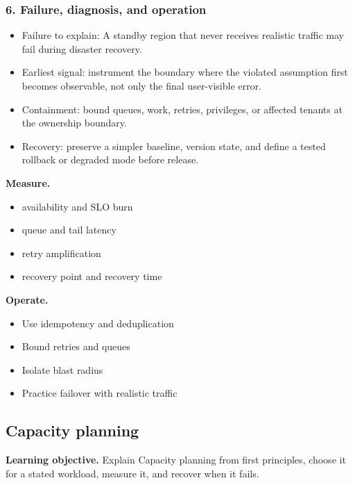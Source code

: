 \subsubsection*{6. Failure, diagnosis, and operation}
\begin{itemize}
\item Failure to explain: A standby region that never receives realistic traffic may fail during disaster recovery.
\item Earliest signal: instrument the boundary where the violated assumption first becomes observable, not only the final user-visible error.
\item Containment: bound queues, work, retries, privileges, or affected tenants at the ownership boundary.
\item Recovery: preserve a simpler baseline, version state, and define a tested rollback or degraded mode before release.
\end{itemize}
\textbf{Measure.}\begin{itemize}
\item availability and SLO burn
\item queue and tail latency
\item retry amplification
\item recovery point and recovery time
\end{itemize}
\textbf{Operate.}\begin{itemize}
\item Use idempotency and deduplication
\item Bound retries and queues
\item Isolate blast radius
\item Practice failover with realistic traffic
\end{itemize}
\subsection{Capacity planning}
\textbf{Learning objective.} Explain Capacity planning from first principles, choose it for a stated workload, measure it, and recover when it fails.
